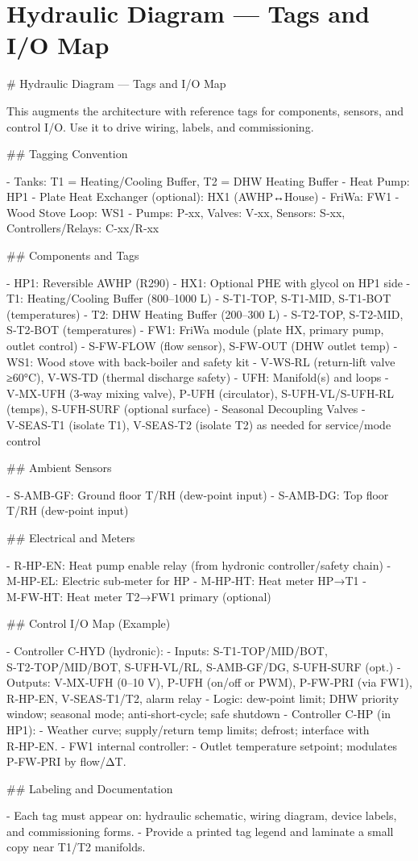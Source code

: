 \documentclass[11pt,oneside]{report}
\begin{document}
\chapter{Hydraulic Diagram — Tags and I/O Map}
\begin{markdown}
# Hydraulic Diagram — Tags and I/O Map

This augments the architecture with reference tags for components, sensors, and control I/O. Use it to drive wiring, labels, and commissioning.

## Tagging Convention

- Tanks: T1 = Heating/Cooling Buffer, T2 = DHW Heating Buffer
- Heat Pump: HP1
- Plate Heat Exchanger (optional): HX1 (AWHP↔House)
- FriWa: FW1
- Wood Stove Loop: WS1
- Pumps: P‑xx, Valves: V‑xx, Sensors: S‑xx, Controllers/Relays: C‑xx/R‑xx

## Components and Tags

- HP1: Reversible AWHP (R290)
- HX1: Optional PHE with glycol on HP1 side
- T1: Heating/Cooling Buffer (800–1000 L)
  - S‑T1‑TOP, S‑T1‑MID, S‑T1‑BOT (temperatures)
- T2: DHW Heating Buffer (200–300 L)
  - S‑T2‑TOP, S‑T2‑MID, S‑T2‑BOT (temperatures)
- FW1: FriWa module (plate HX, primary pump, outlet control)
  - S‑FW‑FLOW (flow sensor), S‑FW‑OUT (DHW outlet temp)
- WS1: Wood stove with back‑boiler and safety kit
  - V‑WS‑RL (return‑lift valve ≥60°C), V‑WS‑TD (thermal discharge safety)
- UFH: Manifold(s) and loops
  - V‑MX‑UFH (3‑way mixing valve), P‑UFH (circulator), S‑UFH‑VL/S‑UFH‑RL (temps), S‑UFH‑SURF (optional surface)
- Seasonal Decoupling Valves
  - V‑SEAS‑T1 (isolate T1), V‑SEAS‑T2 (isolate T2) as needed for service/mode control

## Ambient Sensors

- S‑AMB‑GF: Ground floor T/RH (dew‑point input)
- S‑AMB‑DG: Top floor T/RH (dew‑point input)

## Electrical and Meters

- R‑HP‑EN: Heat pump enable relay (from hydronic controller/safety chain)
- M‑HP‑EL: Electric sub‑meter for HP
- M‑HP‑HT: Heat meter HP→T1
- M‑FW‑HT: Heat meter T2→FW1 primary (optional)

## Control I/O Map (Example)

- Controller C‑HYD (hydronic):
  - Inputs: S‑T1‑TOP/MID/BOT, S‑T2‑TOP/MID/BOT, S‑UFH‑VL/RL, S‑AMB‑GF/DG, S‑UFH‑SURF (opt.)
  - Outputs: V‑MX‑UFH (0–10 V), P‑UFH (on/off or PWM), P‑FW‑PRI (via FW1), R‑HP‑EN, V‑SEAS‑T1/T2, alarm relay
  - Logic: dew‑point limit; DHW priority window; seasonal mode; anti‑short‑cycle; safe shutdown
- Controller C‑HP (in HP1):
  - Weather curve; supply/return temp limits; defrost; interface with R‑HP‑EN.
- FW1 internal controller:
  - Outlet temperature setpoint; modulates P‑FW‑PRI by flow/ΔT.

## Labeling and Documentation

- Each tag must appear on: hydraulic schematic, wiring diagram, device labels, and commissioning forms.
- Provide a printed tag legend and laminate a small copy near T1/T2 manifolds.
\end{markdown}
\end{document}
